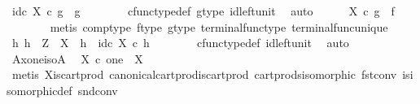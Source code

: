 \begin{isabellebody}
\ {\isachardoublequoteopen}id\isactrlsub c\ X\ {\isasymcirc}\isactrlsub c\ g\ {\isacharequal}{\kern0pt}\ g{\isachardoublequoteclose}\isanewline
\ \ \ \ \ \ \isamarkupfalse%
\ cfunc{\isacharunderscore}{\kern0pt}type{\isacharunderscore}{\kern0pt}def\ g{\isacharunderscore}{\kern0pt}type\ id{\isacharunderscore}{\kern0pt}left{\isacharunderscore}{\kern0pt}unit\ \isamarkupfalse%
\ auto\isanewline
\ \ \ \ \isamarkupfalse%
\ {\isachardoublequoteopen}{\isasymbeta}\isactrlbsub X\isactrlesub \ {\isasymcirc}\isactrlsub c\ g\ {\isacharequal}{\kern0pt}\ f{\isachardoublequoteclose}\isanewline
\ \ \ \ \ \ \isamarkupfalse%
\ {\isacharparenleft}{\kern0pt}metis\ comp{\isacharunderscore}{\kern0pt}type\ f{\isacharunderscore}{\kern0pt}type\ g{\isacharunderscore}{\kern0pt}type\ terminal{\isacharunderscore}{\kern0pt}func{\isacharunderscore}{\kern0pt}type\ terminal{\isacharunderscore}{\kern0pt}func{\isacharunderscore}{\kern0pt}unique{\isacharparenright}{\kern0pt}\isanewline
\ \ \ \ \isamarkupfalse%
\ {\isachardoublequoteopen}{\isasymAnd}h{}{\isachardot}{\kern0pt}\ h{}\ {\isacharcolon}{\kern0pt}\ Z\ {\isasymrightarrow}\ X\ {\isasymLongrightarrow}\ h{}\ {\isacharequal}{\kern0pt}\ id\isactrlsub c\ X\ {\isasymcirc}\isactrlsub c\ h{}{\isachardoublequoteclose}\isanewline
\ \ \ \ \ \ \isamarkupfalse%
\ cfunc{\isacharunderscore}{\kern0pt}type{\isacharunderscore}{\kern0pt}def\ id{\isacharunderscore}{\kern0pt}left{\isacharunderscore}{\kern0pt}unit\ \isamarkupfalse%
\ auto\isanewline
\ \ \isamarkupfalse%
\isanewline
{}\isamarkupfalse%
%
\endisatagproof
{\isafoldproof}%
%
\isadelimproof
\isanewline
%
\endisadelimproof
\isanewline
{}\isamarkupfalse%
\ A{\isacharunderscore}{\kern0pt}x{\isacharunderscore}{\kern0pt}one{\isacharunderscore}{\kern0pt}iso{\isacharunderscore}{\kern0pt}A{\isacharcolon}{\kern0pt}\isanewline
\ \ {\isachardoublequoteopen}X\ {\isasymtimes}\isactrlsub c\ one\ {\isasymcong}\ X{\isachardoublequoteclose}\isanewline
%
\isadelimproof
\ \ %
\endisadelimproof
%
\isatagproof
{}\isamarkupfalse%
\ {\isacharparenleft}{\kern0pt}metis\ X{\isacharunderscore}{\kern0pt}is{\isacharunderscore}{\kern0pt}cart{\isacharunderscore}{\kern0pt}prod{}\ canonical{\isacharunderscore}{\kern0pt}cart{\isacharunderscore}{\kern0pt}prod{\isacharunderscore}{\kern0pt}is{\isacharunderscore}{\kern0pt}cart{\isacharunderscore}{\kern0pt}prod\ cart{\isacharunderscore}{\kern0pt}prods{\isacharunderscore}{\kern0pt}isomorphic\ fst{\isacharunderscore}{\kern0pt}conv\ is{\isacharunderscore}{\kern0pt}isomorphic{\isacharunderscore}{\kern0pt}def\ snd{\isacharunderscore}{\kern0pt}conv{\isacharparenright}{\kern0pt}%

\end{isabellebody}
